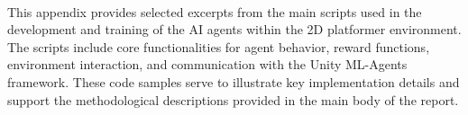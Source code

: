 \documentclass[12pt,oneside,openright,a4paper]{cpe-english-project}
\begin{document}


\makeatletter
\g@addto@macro{\UrlBreaks}{\UrlOrds}
\makeatother
% 




\setcounter{section}{0}
 \\
This appendix provides selected excerpts from the main scripts used in the development and training of the AI agents within the 2D platformer environment. The scripts include core functionalities for agent behavior, reward functions, environment interaction, and communication with the Unity ML-Agents framework. These code samples serve to illustrate key implementation details and support the methodological descriptions provided in the main body of the report.\par
\end{document}
